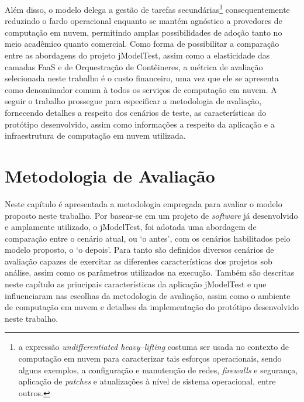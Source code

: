 \documentclass[english,brazilian]{UNISINOSmonografia} %
\begin{document}
Além disso, o modelo delega a gestão de tarefas secundárias\footnote{
	a expressão \textit{undifferentiated heavy--lifting} costuma ser usada no contexto de computação em nuvem para caracterizar tais esforços operacionais, sendo alguns exemplos, a configuração e manutenção de redes, \textit{firewalls} e segurança, aplicação de \textit{patches} e atualizações à nível de sistema operacional, entre outros.
} consequentemente reduzindo o fardo operacional enquanto se mantém agnóstico a provedores de computação em nuvem, permitindo amplas possibilidades de adoção tanto no meio acadêmico quanto comercial.
%
Como forma de possibilitar a comparação entre as abordagens do projeto jModelTest, assim como a elasticidade das camadas FaaS e de Orquestração de Contêineres, a métrica de avaliação selecionada neste trabalho é o custo financeiro, uma vez que ele se apresenta como denominador comum à todos os serviços de computação em nuvem.
%
A seguir o trabalho prossegue para especificar a metodologia de avaliação, fornecendo detalhes a respeito dos cenários de teste, as características do protótipo desenvolvido, assim como informações a respeito da aplicação e a infraestrutura de computação em nuvem utilizada.











\chapter{Metodologia de Avaliação}
\label{ch:modelo-metodologia}




Neste capítulo é apresentada a metodologia empregada para avaliar o modelo proposto neste trabalho.
%
Por basear-se em um projeto de \textit{software} já desenvolvido e amplamente utilizado, o jModelTest, foi adotada uma abordagem de comparação entre o cenário atual, ou \textquoteleft o antes\textquoteright, com os cenários habilitados pelo modelo proposto, o \textquoteleft o depois\textquoteright.
%
Para tanto são definidos diversos cenários de avaliação capazes de exercitar as diferentes características dos projetos sob análise, assim como os parâmetros utilizados na execução.
%
Também são descritas neste capítulo as principais características da aplicação jModelTest e que influenciaram nas escolhas da metodologia de avaliação, assim como o ambiente de computação em nuvem e detalhes da implementação do protótipo desenvolvido neste trabalho.
\end{document}
